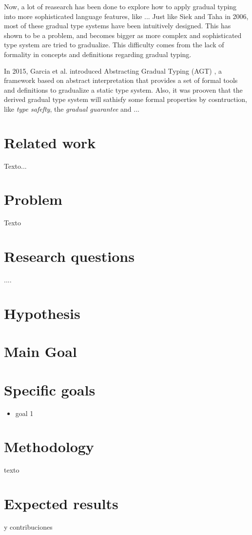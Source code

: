\documentclass[submission]{eptcs}
\begin{document}
Now, a lot of reasearch has been done to explore how to apply gradual typing into more sophisticated language features, like ...
Just like Siek and Taha in 2006, most of these gradual type systems have been intuitively designed.
This has shown to be a problem, and becomes bigger as more complex and sophisticated type system are tried to gradualize. 
This difficulty comes from the lack of formality in concepts and definitions regarding gradual typing.


In 2015, Garcia et al. introduced Abstracting Gradual Typing (AGT) \cite{10.1145/2914770.2837670}, a framework based on abstract interpretation that provides a set of formal tools and definitions to gradualize a static type system.
Also, it was prooven that the derived gradual type system will sathisfy some formal properties by cosntruction, like \textit{type safefty}, the \textit{gradual guarantee} and ...

\section{Related work}

Texto...

\section{Problem}

Texto 

\section{Research questions}

....

\section{Hypothesis}


\section{Main Goal}


\section{Specific goals}

\begin{itemize}
\item goal 1
\end{itemize}

\section{Methodology}

texto

\section{Expected results}

 y contribuciones

\nocite{*}


\end{document}
